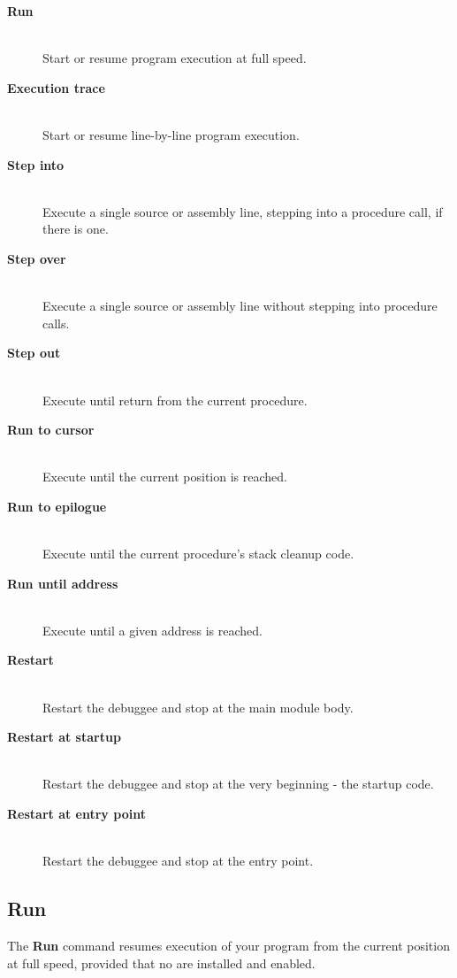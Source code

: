 \begin{description}
\item[{\bf Run}] \mbox{} \\
    Start or resume program execution at full speed.
\item[{\bf Execution trace}] \mbox{} \\
    Start or resume line-by-line program execution.
\item[{\bf Step into}] \mbox{} \\
    Execute a single source or assembly line, stepping into a procedure call,
    if there is one.
\item[{\bf Step over}] \mbox{} \\
    Execute a single source or assembly line without stepping into procedure calls.
\item[{\bf Step out}] \mbox{} \\
    Execute until return from the current procedure.
\item[{\bf Run to cursor}] \mbox{} \\
    Execute until the current 
    position is reached.
\item[{\bf Run to epilogue}] \mbox{} \\
    Execute until the current procedure's stack cleanup code.
\item[{\bf Run until address}] \mbox{} \\
    Execute until a given address is reached.
\item[{\bf Restart}] \mbox{} \\
    Restart the debuggee and stop at the main module body.
\item[{\bf Restart at startup}] \mbox{} \\
    Restart the debuggee and stop at the very beginning - the startup code.
\item[{\bf Restart at entry point}] \mbox{} \\
    Restart the debuggee and stop at the entry point.
\end{description}

\subsection{Run}
\label{dialog:executing:run}

The {\bf Run} command resumes execution of your program from
the current position at full speed, provided that no
 are installed and enabled.

